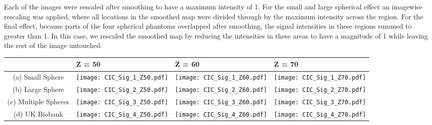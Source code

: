 Each of the images were rescaled after smoothing to have a maximum intensity of 1. For the small and large spherical effect an imagewise rescaling was applied, where all locations in the smoothed map were divided through by the maximum intensity across the region. For the final effect, because parts of the four spherical phantoms overlapped after smoothing, the signal intensities in these regions summed to greater than 1. In this case, we rescaled the smoothed map by reducing the intensities in these areas to have a magnitude of 1 while leaving the rest of the image untouched. 

\begin{table}[htbp]
\hspace*{-0.5cm}
\begin{adjustbox}{center}
\centering
    \begin{tabular}{cm{50mm}m{50mm}m{50mm}}
       \toprule
         & \hspace{14.8mm} Z = 50 & \hspace{14.8mm} Z = 60 & \hspace{14.8mm} Z = 70 \\
        \midrule
        (a) Small Sphere & \texttt{[image: CIC\_Sig\_1\_Z50.pdf]} & \texttt{[image: CIC\_Sig\_1\_Z60.pdf]} & \texttt{[image: CIC\_Sig\_1\_Z70.pdf]} \\
        (b) Large Sphere & \texttt{[image: CIC\_Sig\_2\_Z50.pdf]} & \texttt{[image: CIC\_Sig\_2\_Z60.pdf]} & \texttt{[image: CIC\_Sig\_2\_Z70.pdf]} \\
        (c) Multiple Spheres & \texttt{[image: CIC\_Sig\_3\_Z50.pdf]} & \texttt{[image: CIC\_Sig\_3\_Z60.pdf]} & \texttt{[image: CIC\_Sig\_3\_Z70.pdf]} \\
        (d) UK Biobank & \texttt{[image: CIC\_Sig\_4\_Z50.pdf]} & \texttt{[image: CIC\_Sig\_4\_Z60.pdf]} & \texttt{[image: CIC\_Sig\_4\_Z70.pdf]} \\
        \bottomrule
    \end{tabular}
\end{adjustbox}
    \label{tbl:Cohens_d_3D_figures}
\end{table}

